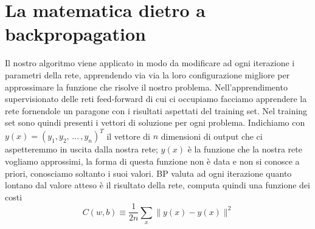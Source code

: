 \section{La matematica dietro a backpropagation}
Il nostro algoritmo viene applicato in modo da modificare ad ogni iterazione i parametri della rete, apprendendo via via la loro configurazione migliore per approssimare la funzione che risolve il nostro problema. Nell'apprendimento supervisionato delle reti feed-forward di cui ci occupiamo facciamo apprendere la rete fornendole un paragone con i risultati aspettati del training set. Nel training set sono quindi presenti i vettori di soluzione per ogni problema. Indichiamo con $ y(x)=(y_{1}, y_{2},\, \dots \, , y_{n})^{T} $ il vettore di $n$ dimensioni di output che ci aspetteremmo in uscita dalla  nostra rete; $y(x)$ è la funzione che la nostra rete vogliamo approssimi, la forma di questa funzione non è data e non si conosce a priori, conosciamo soltanto i suoi valori. BP valuta ad ogni iterazione quanto lontano dal valore atteso è il risultato della rete, computa quindi una funzione dei costi
\begin{equation}
	C(w,b)\equiv\frac{1}{2n}\sum_{x} \parallel y(x)-\hat{y}(x)\parallel^{2}
\end{equation} 


